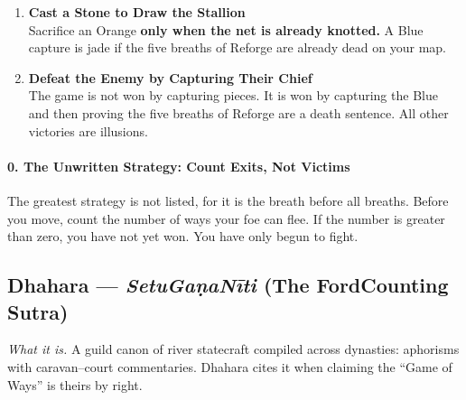 \documentclass[11pt]{article}
\begin{document}
\begin{enumerate}[leftmargin=*,label=\textbf{\arabic*.}]
\item \textbf{Cast a Stone to Draw the Stallion}\\
Sacrifice an Orange \textbf{only when the net is already knotted.} A Blue capture is jade if the five breaths of Reforge are already dead on your map.

\item \textbf{Defeat the Enemy by Capturing Their Chief}\\
The game is not won by capturing pieces. It is won by capturing the Blue and then proving the five breaths of Reforge are a death sentence. All other victories are illusions.
\end{enumerate}

\paragraph*{0. The Unwritten Strategy: Count Exits, Not Victims}
The greatest strategy is not listed, for it is the breath before all breaths. Before you move, count the number of ways your foe can flee. If the number is greater than zero, you have not yet won. You have only begun to fight.

\clearpage

\subsection{Dhahara — \textit{Setu\textendash Gaṇa\textendash Nīti} (The Ford\textendash Counting Sutra)}
\textit{What it is.} A guild canon of river statecraft compiled across dynasties: aphorisms with caravan–court commentaries. Dhahara cites it when claiming the “Game of Ways” is theirs by right.
\end{document}
